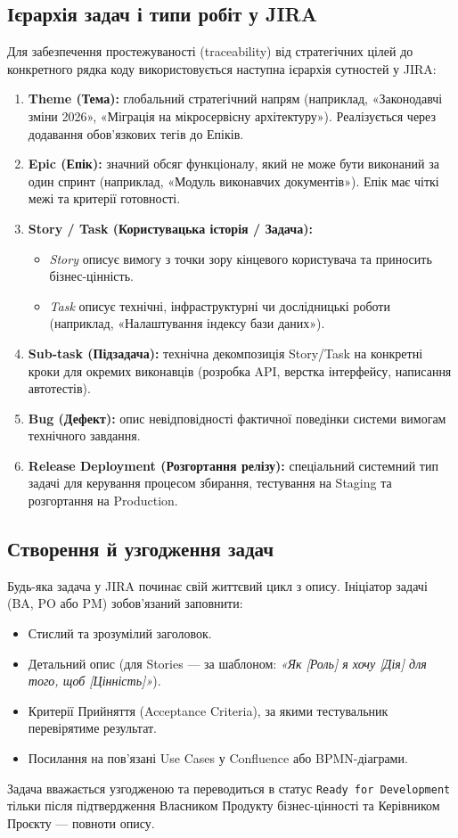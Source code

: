 \documentclass{article}
\begin{document}
\subsection{Ієрархія задач і типи робіт у JIRA}
Для забезпечення простежуваності (traceability) від стратегічних цілей до конкретного рядка коду використовується наступна ієрархія сутностей у JIRA:
\begin{enumerate}
    \item \textbf{Theme (Тема):} глобальний стратегічний напрям (наприклад, «Законодавчі зміни 2026», «Міграція на мікросервісну архітектуру»). Реалізується через додавання обов'язкових тегів до Епіків.
    \item \textbf{Epic (Епік):} значний обсяг функціоналу, який не може бути виконаний за один спринт (наприклад, «Модуль виконавчих документів»). Епік має чіткі межі та критерії готовності.
    \item \textbf{Story / Task (Користувацька історія / Задача):} 
    \begin{itemize}
        \item \emph{Story} описує вимогу з точки зору кінцевого користувача та приносить бізнес-цінність.
        \item \emph{Task} описує технічні, інфраструктурні чи дослідницькі роботи (наприклад, «Налаштування індексу бази даних»).
    \end{itemize}
    \item \textbf{Sub-task (Підзадача):} технічна декомпозиція Story/Task на конкретні кроки для окремих виконавців (розробка API, верстка інтерфейсу, написання автотестів).
    \item \textbf{Bug (Дефект):} опис невідповідності фактичної поведінки системи вимогам технічного завдання.
    \item \textbf{Release Deployment (Розгортання релізу):} спеціальний системний тип задачі для керування процесом збирання, тестування на Staging та розгортання на Production.
\end{enumerate}

\subsection{Створення й узгодження задач}
Будь-яка задача у JIRA починає свій життєвий цикл з опису. Ініціатор задачі (BA, PO або PM) зобов'язаний заповнити:
\begin{itemize}
    \item Стислий та зрозумілий заголовок.
    \item Детальний опис (для Stories --- за шаблоном: \emph{«Як [Роль] я хочу [Дія] для того, щоб [Цінність]»}).
    \item Критерії Прийняття (Acceptance Criteria), за якими тестувальник перевірятиме результат.
    \item Посилання на пов'язані Use Cases у Confluence або BPMN-діаграми.
\end{itemize}
Задача вважається узгодженою та переводиться в статус \texttt{Ready for Development} тільки після підтвердження Власником Продукту бізнес-цінності та Керівником Проєкту --- повноти опису.
\end{document}

